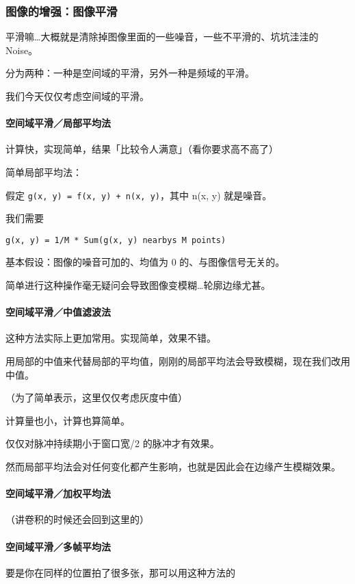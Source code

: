 \documentclass[
]{article}
\begin{document}
\hypertarget{header-n31}{%
\subsubsection{图像的增强：图像平滑}\label{header-n31}}

平滑嘛\ldots 大概就是清除掉图像里面的一些噪音，一些不平滑的、坑坑洼洼的
Noise。

分为两种：一种是空间域的平滑，另外一种是频域的平滑。

我们今天仅仅考虑空间域的平滑。

\hypertarget{header-n35}{%
\paragraph{空间域平滑／局部平均法}\label{header-n35}}

计算快，实现简单，结果「比较令人满意」（看你要求高不高了）

简单局部平均法：

假定 \texttt{g(x,\ y)\ =\ f(x,\ y)\ +\ n(x,\ y)}，其中 n(x, y)
就是噪音。

我们需要

\texttt{g(x,\ y)\ =\ 1/M\ *\ Sum(g(x,\ y)\ nearby\textquotesingle{}s\ M\ points)}

基本假设：图像的噪音可加的、均值为 0 的、与图像信号无关的。

简单进行这种操作毫无疑问会导致图像变模糊\ldots 轮廓边缘尤甚。

\hypertarget{header-n43}{%
\paragraph{空间域平滑／中值滤波法}\label{header-n43}}

这种方法实际上更加常用。实现简单，效果不错。

用局部的中值来代替局部的平均值，刚刚的局部平均法会导致模糊，现在我们改用中值。

（为了简单表示，这里仅仅考虑灰度中值）

计算量也小，计算也算简单。

仅仅对脉冲持续期小于窗口宽/2 的脉冲才有效果。

然而局部平均法会对任何变化都产生影响，也就是因此会在边缘产生模糊效果。

\hypertarget{header-n50}{%
\paragraph{空间域平滑／加权平均法}\label{header-n50}}

（讲卷积的时候还会回到这里的）

\hypertarget{header-n52}{%
\paragraph{空间域平滑／多帧平均法}\label{header-n52}}

要是你在同样的位置拍了很多张，那可以用这种方法的
\end{document}
